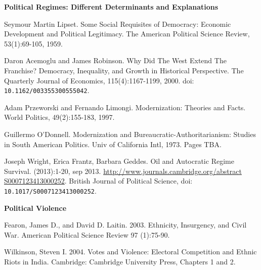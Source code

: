 \documentclass[letterpaper]{article}
\renewenvironment{itemize}{
  \begin{list}{}{
    \setlength{\leftmargin}{1.5em}
  }
}{
  \end{list}
}
\begin{document}
\begin{enumerate}
\item {\bf Political Regimes: Different Determinants and Explanations}
	\begin{itemize}
		\item[$\bullet$] Seymour Martin Lipset. Some Social Requisites of Democracy: Economic Development and Political Legitimacy. The American Political Science Review, 53(1):69-105, 1959.
		\item[$\bullet$] Daron Acemoglu and James Robinson. Why Did The West Extend The Franchise? Democracy, Inequality, and Growth in Historical Perspective. The Quarterly Journal of Economics, 115(4):1167-1199, 2000. doi: \texttt{10.1162/003355300555042}.
		\item[$\bullet$] Adam Przeworski and Fernando Limongi. Modernization: Theories and Facts. World Politics, 49(2):155-183, 1997.
		\item[$\bullet$] Guillermo O'Donnell. Modernization and Bureaucratic-Authoritarianism: Studies in South American Politics. Univ of California Intl, 1973. Pages TBA.
		\item[$\bullet$] Joseph Wright, Erica Frantz, Barbara Geddes. Oil and Autocratic Regime Survival. (2013):1-20, sep 2013. \url{http://www.journals.cambridge.org/abstract S0007123413000252}. British Journal of Political Science, doi: \texttt{10.1017/S0007123413000252}.
	\end{itemize}






\item {\bf Political Violence}
	\begin{itemize}
		\item[$\bullet$] Fearon, James D., and David D. Laitin. 2003. Ethnicity, Insurgency, and Civil War. American Political Science Review 97 (1):75-90.
		\item[$\bullet$] Wilkinson, Steven I. 2004. Votes and Violence: Electoral Competition and Ethnic Riots in India. Cambridge: Cambridge University Press, Chapters 1 and 2.
	\end{itemize}




\end{enumerate}
\end{document}
